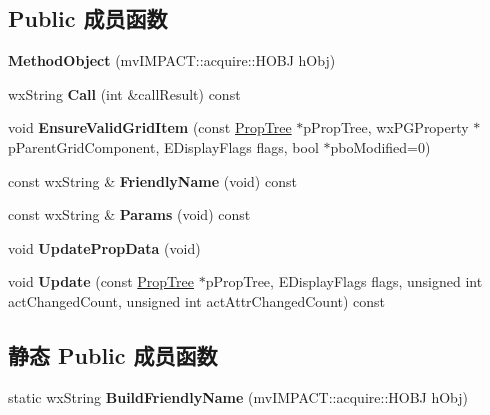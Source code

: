 \subsection*{Public 成员函数}
\begin{DoxyCompactItemize}
\item 
\hypertarget{class_method_object_afbc5738f632b486ff68b58bfa2bb3f35}{{\bfseries Method\+Object} (mv\+I\+M\+P\+A\+C\+T\+::acquire\+::\+H\+O\+B\+J h\+Obj)}\label{class_method_object_afbc5738f632b486ff68b58bfa2bb3f35}

\item 
\hypertarget{class_method_object_a05e863506c12142ea7b4bc73c93f8cba}{wx\+String {\bfseries Call} (int \&call\+Result) const }\label{class_method_object_a05e863506c12142ea7b4bc73c93f8cba}

\item 
\hypertarget{class_method_object_af4f458ee1a4cbaba2de33bab558dfab6}{void {\bfseries Ensure\+Valid\+Grid\+Item} (const \hyperlink{class_prop_tree}{Prop\+Tree} $\ast$p\+Prop\+Tree, wx\+P\+G\+Property $\ast$p\+Parent\+Grid\+Component, E\+Display\+Flags flags, bool $\ast$pbo\+Modified=0)}\label{class_method_object_af4f458ee1a4cbaba2de33bab558dfab6}

\item 
\hypertarget{class_method_object_ad9332f7e46c5585b4e45bcaaa5658d00}{const wx\+String \& {\bfseries Friendly\+Name} (void) const }\label{class_method_object_ad9332f7e46c5585b4e45bcaaa5658d00}

\item 
\hypertarget{class_method_object_a4e6f8c9782d51da3107166c352b6571a}{const wx\+String \& {\bfseries Params} (void) const }\label{class_method_object_a4e6f8c9782d51da3107166c352b6571a}

\item 
\hypertarget{class_method_object_aa25cd5e6fd5382a83c15a9aae0642b95}{void {\bfseries Update\+Prop\+Data} (void)}\label{class_method_object_aa25cd5e6fd5382a83c15a9aae0642b95}

\item 
\hypertarget{class_method_object_a4f54e2153aa12b4a0618d13a74ecd6ee}{void {\bfseries Update} (const \hyperlink{class_prop_tree}{Prop\+Tree} $\ast$p\+Prop\+Tree, E\+Display\+Flags flags, unsigned int act\+Changed\+Count, unsigned int act\+Attr\+Changed\+Count) const }\label{class_method_object_a4f54e2153aa12b4a0618d13a74ecd6ee}

\end{DoxyCompactItemize}
\subsection*{静态 Public 成员函数}
\begin{DoxyCompactItemize}
\item 
\hypertarget{class_method_object_a7841a59c258c682ade95bd53b10ad161}{static wx\+String {\bfseries Build\+Friendly\+Name} (mv\+I\+M\+P\+A\+C\+T\+::acquire\+::\+H\+O\+B\+J h\+Obj)}\label{class_method_object_a7841a59c258c682ade95bd53b10ad161}

\end{DoxyCompactItemize}
